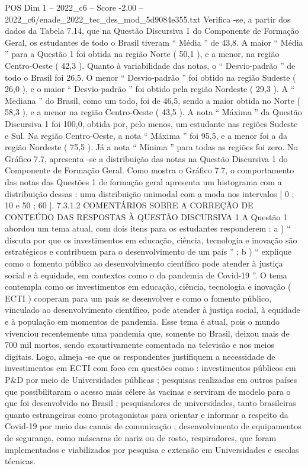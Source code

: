 \begin{textsample}{POS Dim 1 – 2022\_c6 – Score -2.00 – 2022\_c6/enade\_2022\_tec\_des\_mod\_5d9084e355.txt}
Verifica -se, a partir dos dados da Tabela 7.14, que na Questão Discursiva 1 do Componente de Formação Geral, os estudantes de todo o Brasil tiveram “ Média ” de 43,8.
A maior “ Média ” para a Questão 1 foi obtida na região Norte ( 50,1 ), e a menor, na região Centro-Oeste ( 42,3 ).
Quanto à variabilidade das notas, o “ Desvio-padrão ” de todo o Brasil foi 26,5.
O menor “ Desvio-padrão ” foi obtido na região Sudeste ( 26,0 ), e o maior “ Desvio-padrão ” foi obtido pela região Nordeste ( 29,3 ).
A “ Mediana ” do Brasil, como um todo, foi de 46,5, sendo a maior obtida no Norte ( 58,3 ), e a menor na região Centro-Oeste ( 43,5 ).
A nota “ Máxima ” da Questão Discursiva 1 foi 100,0, obtida por, pelo menos, um estudante nas regiões Sudeste e Sul.
Na região Centro-Oeste, a nota “ Máxima ” foi 95,5, e a menor foi a da região Nordeste ( 75,5 ).
Já a nota “ Mínima ” para todas as regiões foi zero.
No Gráfico 7.7, apresenta -se a distribuição das notas na Questão Discursiva 1 do Componente de Formação Geral.
Como mostra o Gráfico 7.7, o comportamento das notas das Questões 1 de formação geral apresenta um histograma com a distribuição dessas : uma distribuição unimodal com a moda nos intervalos [ 0 ; 10 e 50 ; 60 ]. 7.3.1.2 COMENTÁRIOS SOBRE A CORREÇÃO DE CONTEÚDO DAS RESPOSTAS À QUESTÃO DISCURSIVA 1 A Questão 1 abordou um tema atual, com dois itens para os estudantes responderem : a ) “ discuta por que os investimentos em educação, ciência, tecnologia e inovação são estratégicos e contribuem para o desenvolvimento de um país ” ; b ) “ explique como o fomento público ao desenvolvimento científico pode atender à justiça social e à equidade, em contextos como o da pandemia de Covid-19 ”.
O tema contempla como os investimentos em educação, ciência, tecnologia e inovação ( ECTI ) cooperam para um país se desenvolver e como o fomento público, vinculado ao desenvolvimento científico, pode atender à justiça social, à equidade e à população em momentos de pandemia.
Esse tema é atual, pois o mundo vivenciou recentemente uma pandemia que, somente no Brasil, deixou mais de 700 mil mortos, sendo exaustivamente comentada na televisão e nos meios digitais.
Logo, almeja -se que os respondentes justifiquem a necessidade de investimentos em ECTI com foco em questões como : investimentos públicos em P\&D por meio de Universidades públicas ; pesquisas realizadas em outros países que possibilitaram o acesso mais célere às vacinas e serviram de modelo para o que foi desenvolvido no Brasil ; pesquisadores de universidades, tanto brasileiras quanto estrangeiras como protagonistas para orientar e informar a respeito da Covid-19 por meio dos canais de comunicação ; desenvolvimento de equipamentos de segurança, como máscaras de nariz ou de rosto, respiradores, que foram implementados e viabilizados por pesquisa e extensão em Universidades e escolas técnicas.

\end{textsample}
